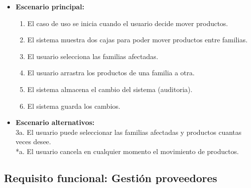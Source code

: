 \begin{itemize}\renewcommand{\labelitemi}{$\circ$}
 \item \textbf{Escenario principal:}
         \begin{enumerate}
          \item El caso de uso se inicia cuando el usuario decide mover productos.
          \item El sistema muestra dos cajas para poder mover productos entre familias.
          \item El usuario selecciona las familias afectadas.
          \item El usuario arrastra los productos de una familia a otra.
 	  \item El sistema almacena el cambio del sistema (auditoria).
          \item El sistema guarda los cambios.
         \end{enumerate}
  \item \textbf{Escenario alternativos:}\\
  	   3a. El usuario puede seleccionar las familias afectadas y productos cuantas veces desee.\\
           *a. El usuario cancela en cualquier momento el movimiento de productos.
\end{itemize}

\subsection{Requisito funcional: Gestión proveedores}

